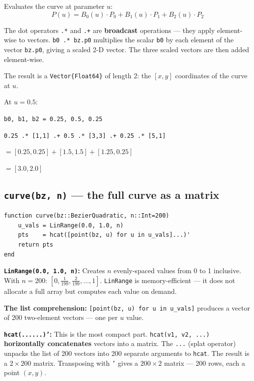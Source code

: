 \documentclass[12pt, a4paper]{article}
\newcommand{\cd}[1]{\texttt{#1}}
\begin{document}
Evaluates the curve at parameter $u$:
\[
  P(u) = B_0(u) \cdot P_0 + B_1(u) \cdot P_1 + B_2(u) \cdot P_2
\]

The dot operators \cd{.*} and \cd{.+} are
\textbf{broadcast} operations --- they apply element-wise
to vectors.
\cd{b0 .* bz.p0} multiplies the scalar \cd{b0} by each
element of the vector \cd{bz.p0},
giving a scaled 2-D vector.
The three scaled vectors are then added element-wise.

The result is a \cd{Vector\{Float64\}} of length 2:
the $[x, y]$ coordinates of the curve at $u$.

\begin{examplebox}
At $u = 0.5$:

\cd{b0, b1, b2 = 0.25, 0.5, 0.25}

\cd{0.25 .* [1,1] .+ 0.5 .* [3,3] .+ 0.25 .* [5,1]}

$= [0.25, 0.25] + [1.5, 1.5] + [1.25, 0.25]$

$= [3.0, 2.0]$ \checkmark
\end{examplebox}

\subsection{\texttt{curve(bz, n)} --- the full curve as a matrix}

\begin{verbatim}
function curve(bz::BezierQuadratic, n::Int=200)
    u_vals = LinRange(0.0, 1.0, n)
    pts    = hcat([point(bz, u) for u in u_vals]...)'
    return pts
end
\end{verbatim}

\textbf{\cd{LinRange(0.0, 1.0, n)}:}
Creates $n$ evenly-spaced values from 0 to 1 inclusive.
With $n = 200$: $[0, \tfrac{1}{199}, \tfrac{2}{199}, \ldots, 1]$.
\cd{LinRange} is memory-efficient --- it does not allocate
a full array but computes each value on demand.

\textbf{The list comprehension:}
\cd{[point(bz, u) for u in u\_vals]} produces a vector
of 200 two-element vectors --- one per $u$ value.

\textbf{\cd{hcat(......)'}:}
This is the most compact part.
\cd{hcat(v1, v2, ...)} \textbf{horizontally concatenates}
vectors into a matrix.
The \cd{...} (splat operator) unpacks the list of 200
vectors into 200 separate arguments to \cd{hcat}.
The result is a $2 \times 200$ matrix.
Transposing with \cd{'} gives a $200 \times 2$ matrix ---
200 rows, each a point $(x, y)$.
\end{document}
